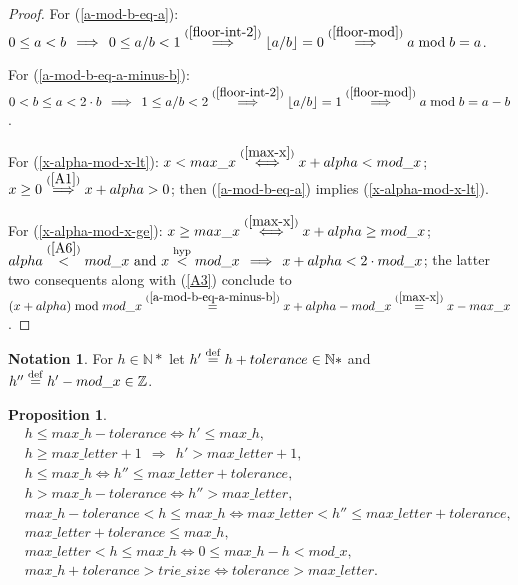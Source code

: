 \documentclass[a4paper,9pt,leqno]{article}
\renewcommand{\=}{\protect\nobreakdash-\hspace{0pt}}
\renewcommand{\~}{\protect\nobreakdash--\hspace{0pt}}
\theoremstyle{plain}
\newtheorem{prop}[fact]{Proposition}
\theoremstyle{definition}
\newtheorem{notn}[fact]{Notation}
\theoremstyle{remark}
\newcommand{\floor}[1]{\lfloor#1\rfloor}
\newcommand{\impll}{\:\:\Longrightarrow\:\:}
\newcommand{\impl}{\impll}%
\newcommand{\iffl}{\:\:\Longleftrightarrow\:\:}
\newcommand{\parref}[1]{(\ref{#1})}
\newcommand{\by}[1]{{#1}}
\newcommand{\bydef}{\by{def}}
\newcommand{\byhyp}{\by{hyp}}
\newcommand{\symby}[2]{\stackrel{#1}{{#2}}}
\newcommand{\symbyrm}[2]{\symby{{\rm\scriptstyle{#1}}}{#2}}
\newcommand{\implby}[1]{\symbyrm{#1}{\impll}}
\newcommand{\implbyref}[1]{\implby{\parref{#1}}}
\newcommand{\iffby}[1]{\symbyrm{#1}{\iffl}}
\newcommand{\iffbyref}[1]{\iffby{\parref{#1}}}
\newcommand{\eqby}[1]{\symbyrm{#1}{=}}
\newcommand{\eqbydef}{\eqby{\bydef}}
\newcommand{\eqbyref}[1]{\eqby{\parref{#1}}}
\newcommand{\gt}{>}
\newcommand{\lt}{<}
\newcommand{\ltby}[1]{\symbyrm{#1}{\lt}}
\newcommand{\ltbyref}[1]{\ltby{\parref{#1}}}
\newcommand{\ltbyhyp}{\ltby{\byhyp}}
\newcommand\Nat{\mathbb{N}}
\newcommand\Nat*{\mathbb{N}^*}
\newcommand\Int{\mathbb{Z}}
\newcommand\Int*{\mathbb{Z}^*}
\begin{document}
\begin{proof}
For \parref{a-mod-b-eq-a}: $0 \le a \lt b \impl 0 \le a/b \lt 1
\implbyref{floor-int-2} \floor{a/b} = 0 \implbyref{floor-mod} a \bmod b = a$.

For \parref{a-mod-b-eq-a-minus-b}: $0 \lt b \le a \lt 2 \cdot b \impl 1 \le a/b \lt 2
\implbyref{floor-int-2} \floor{a/b} = 1 \implbyref{floor-mod} a \bmod b = a - b$.

For \parref{x-alpha-mod-x-lt}: $x \lt max\_x \iffbyref{max-x} x + alpha \lt mod\_x$;
$x \ge 0 \implbyref{A1} x + alpha \gt 0$; then \parref{a-mod-b-eq-a} implies
\parref{x-alpha-mod-x-lt}.

For \parref{x-alpha-mod-x-ge}: $x \ge max\_x \iffbyref{max-x} x + alpha \ge mod\_x$;
$alpha \ltbyref{A6} mod\_x\text{ and }x \ltbyhyp mod\_x \impl x + alpha \lt 2 \cdot mod\_x$;
the latter two consequents along with \parref{A3} conclude to
$(x + alpha) \bmod mod\_x \eqbyref{a-mod-b-eq-a-minus-b} x + alpha - mod\_x
\eqbyref{max-x} x - max\_x$. 
\end{proof}

\begin{notn}
For $h \in \Nat*$ let $h' \eqbydef h + tolerance \in \Nat*$ and
$h'' \eqbydef h' - mod\_x \in \Int$.
\end{notn}

\begin{prop}
\begin{align}
& h \le max\_h - tolerance \iff h' \le max\_h,          \label{h-le-max-h-minus-tol}\\
%
& h \ge max\_letter + 1 \impl h' \gt max\_letter + 1,   \label{h-max-letter-plus-1}\\
%
& h \le max\_h \iff h'' \le max\_letter + tolerance,    \label{h-plus-tol-minus-mod-x-le}\\
%
& h \gt max\_h - tolerance \iff h'' \gt max\_letter,    \label{h-plus-tol-minus-mod-x-gt}\\
%
& max\_h - tolerance \lt h \le max\_h \iff 
max\_letter \lt h'' \le max\_letter + tolerance,        \label{h-plus-tol-minus-mod-x}\\
%
& max\_letter + tolerance \le max\_h,                   \label{max-letter-plus-tol-lt-max-h}\\
%
& max\_letter \lt h \le max\_h \iff 0 \le max\_h - h \lt mod\_x,
                                                        \label{max-h-minus-h}\\
%
& max\_h + tolerance \gt trie\_size \iff tolerance \gt max\_letter.
                                                        \label{max-h-plus-tol}
\end{align}
\end{prop}
\end{document}

